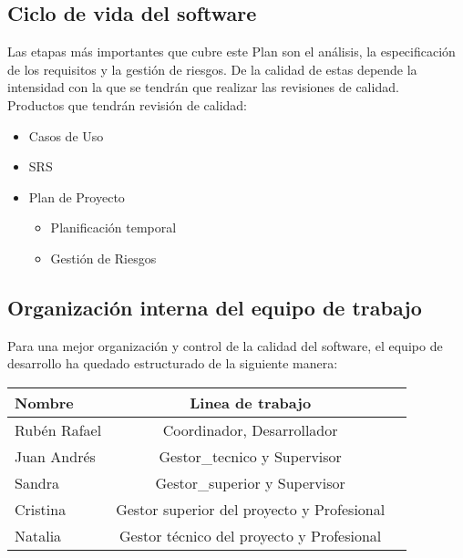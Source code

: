 \documentclass[11pt, a4paper, twoside, titlepage]{article}
\begin{document}
		\subsection{Ciclo de vida del software} %
			Las etapas más importantes que cubre este Plan son el análisis, la especificación de los requisitos y la gestión de riesgos. De la calidad de estas depende la intensidad con la que se tendrán que realizar las revisiones de calidad. \\
			Productos que tendrán revisión de calidad: \\
				\begin{itemize}
					\item Casos de Uso
					\item SRS
					\item Plan de Proyecto
						\begin{itemize}
							\item Planificación temporal
							\item Gestión de Riesgos
						\end{itemize}
				\end{itemize}
				
		\subsection{Organización interna del equipo de trabajo}
		
			Para una mejor organización y control de la calidad del software, el equipo de desarrollo ha quedado estructurado de la siguiente manera:
			
			\begin{center}
				\begin{tabular}{|l |c |r|}
				\hline
				\textbf{Nombre} & \textbf{Linea de trabajo}\\
				\hline
				Rubén Rafael & Coordinador, Desarrollador\\
				\hline
				Juan Andrés & \gls{Gestor_tecnico} y Supervisor\\
				\hline
				Sandra & \gls{Gestor_superior} y Supervisor\\
				\hline
				Cristina & Gestor superior del proyecto y \gls{Profesional}\\
				\hline
				Natalia & Gestor técnico del proyecto y Profesional\\
				\hline
				\end{tabular}
			\end{center}
			
\end{document}
